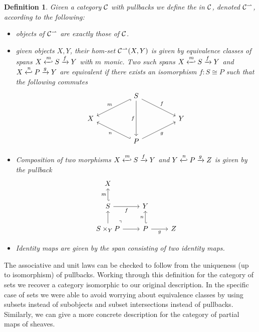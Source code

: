 \documentclass[11pt]{article}
\newtheorem{defn}[thrm]{Definition}
\begin{document}
\begin{defn}
  Given a category \(\mathcal{C}\) with pullbacks we define the  in \(\mathcal{C}\), denoted \({\mathcal{C}}^\rightharpoonup\), according to the following:
  \begin{itemize}
    \item objects of \({\mathcal{C}}^\rightharpoonup\) are exactly those of \(\mathcal{C}\).
    \item given objects \(X,Y\), their hom-set \({\mathcal{C}}^\rightharpoonup(X,Y)\) is given by
      equivalence classes of spans \(X \xhookleftarrow{m} S \xrightarrow{f} Y\)
      with \(m\) monic. Two such spans
      \(X \xhookleftarrow{m} S \xrightarrow{f} Y\) and
      \(X \xhookleftarrow{n} P \xrightarrow{g} Y\) are equivalent if there
      exists an isomorphism \(f : S \cong P\) such that the following commutes
      \[\begin{tikzcd}
          && S \\
          X &&&& Y \\
          && P \arrow["m"', hook, from=1-3, to=2-1] \arrow["f", from=1-3, to=2-5] \arrow["f"', from=1-3, to=3-3] \arrow["n", hook', from=3-3, to=2-1] \arrow["g"', from=3-3, to=2-5]
        \end{tikzcd}\]
    \item Composition of two morphisms
      \(X \xhookleftarrow{m} S \xrightarrow{f} Y\) and
      \(Y \xhookleftarrow{n} P \xrightarrow{g} Z\) is given by the pullback
      \[\begin{tikzcd}
          X \\
          S & Y \\
          {S\times_YP} & P & Z \arrow["m", hook', from=2-1, to=1-1] \arrow["f"', from=2-1, to=2-2] \arrow[from=3-1, to=2-1] \arrow["\lrcorner"{anchor=center, pos=0.125, rotate=90}, draw=none, from=3-1, to=2-2] \arrow[from=3-1, to=3-2] \arrow["n", hook', from=3-2, to=2-2] \arrow["g"', from=3-2, to=3-3]
        \end{tikzcd}\]
    \item Identity maps are given by the span consisting of two identity maps.
  \end{itemize}
\end{defn}

The associative and unit laws can be checked to follow from the uniqueness (up
to isomorphism) of pullbacks. Working through this definition for the category
of sets we recover a category isomorphic to our original description. In the
specific case of sets we were able to avoid worrying about equivalence classes
by using subsets instead of subobjects and subset intersections instead of
pullbacks. Similarly, we can give a more concrete description for the category
of partial maps of sheaves.
\end{document}
